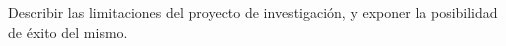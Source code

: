 Describir las limitaciones del proyecto de investigación, y exponer la posibilidad de éxito del mismo.

